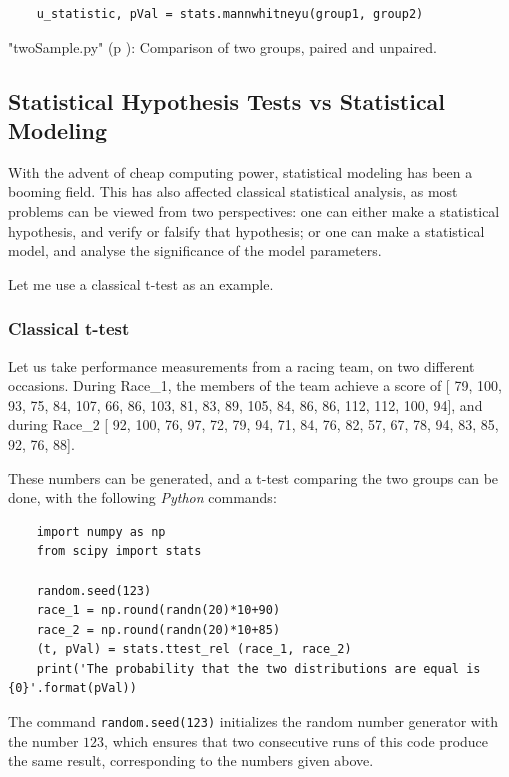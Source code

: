 \begin{lstlisting}
    u_statistic, pVal = stats.mannwhitneyu(group1, group2)
\end{lstlisting}


\PyImg "twoSample.py" (p \pageref{py:twoSample}): Comparison of two groups, paired and unpaired.

\subsection{Statistical Hypothesis Tests vs Statistical Modeling}

With the advent of cheap computing power, statistical modeling has been a booming field. This has also affected classical statistical analysis, as most problems can be viewed from two perspectives: one can either make a statistical hypothesis, and verify or falsify that hypothesis; or one can make a statistical model, and analyse the significance of the model parameters.

Let me use a classical t-test as an example.

\subsubsection{Classical t-test}

Let us take performance measurements from a racing team, on two different occasions. During Race\_1, the members of the team achieve a score of [ 79, 100, 93, 75, 84, 107, 66, 86, 103, 81, 83, 89, 105, 84, 86, 86, 112, 112, 100, 94], and during Race\_2 [ 92, 100, 76, 97, 72, 79, 94, 71, 84, 76, 82, 57, 67, 78, 94, 83, 85, 92, 76, 88].

These numbers can be generated, and a t-test comparing the two groups can be done, with the following \emph{Python} commands:

\begin{lstlisting}
    import numpy as np
    from scipy import stats

    random.seed(123)
    race_1 = np.round(randn(20)*10+90)
    race_2 = np.round(randn(20)*10+85)
    (t, pVal) = stats.ttest_rel (race_1, race_2)
    print('The probability that the two distributions are equal is {0}'.format(pVal))
\end{lstlisting}

The command \lstinline{random.seed(123)} initializes the random number generator with the number $123$, which ensures that two consecutive runs of this code produce the same result, corresponding to the numbers given above.

